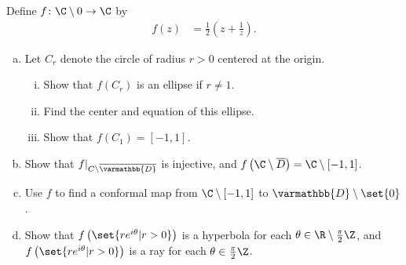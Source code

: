 \documentclass[10pt]{mypackage}
\renewcommand*{\mathbb}[1]{\varmathbb{#1}}
\begin{document}
\begin{problem}[Problem 5]
  Define $f\colon \C\setminus 0 \rightarrow \C$ by
  \begin{align*}
    f(z) &= \frac{1}{2}\left( z + \frac{1}{z} \right).
  \end{align*}
  \begin{enumerate}[(a)]
    \item Let $C_r$ denote the circle of radius $r > 0$ centered at the origin.
      \begin{enumerate}[(i)]
        \item Show that $f\left( C_r \right)$ is an ellipse if $r\neq 1$.
        \item Find the center and equation of this ellipse.
        \item Show that $f\left( C_1 \right) = \left[ -1,1 \right]$.
      \end{enumerate}
    \item Show that $f|_{C\setminus \overline{ \mathbb{D} }}$ is injective, and $ f\left( \C\setminus \overline{D} \right) = \C\setminus \left[ -1,1 \right] $.
    \item Use $f$ to find a conformal map from $\C\setminus \left[ -1,1 \right]$ to $ \mathbb{D}\setminus \set{0} $.
    \item Show that $ f\left( \set{re^{i\theta} | r > 0} \right) $ is a hyperbola for each $\theta\in \R\setminus \frac{\pi}{2}\Z$, and $f\left( \set{re^{i\theta} | r > 0} \right)$ is a ray for each $\theta\in \frac{\pi}{2}\Z$.
  \end{enumerate}
\end{problem}
\end{document}
